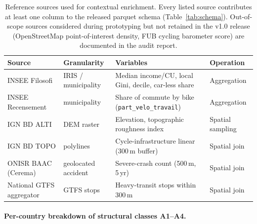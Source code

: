 \documentclass[11pt,a4paper]{article}
\begin{document}
\begin{table}[!htbp]
\centering
\caption{Reference sources used for contextual enrichment. Every
listed source contributes at least one column to the released
parquet schema (Table~\ref{tab:schema}). Out-of-scope sources
considered during prototyping but not retained in the v1.0
release (OpenStreetMap point-of-interest density, FUB cycling
barometer score) are documented in the audit report.}
\label{tab:sources}
\small
\begin{tabular}{@{}llll@{}}
\toprule
\textbf{Source} & \textbf{Granularity} & \textbf{Variables} &
\textbf{Operation}\\
\midrule
INSEE Filosofi      & IRIS / municipality &
   Median income/CU, local Gini, decile, car-less share & Aggregation \\
INSEE Recensement   & municipality &
   Share of commute by bike (\texttt{part\_velo\_travail})  & Aggregation \\
IGN BD ALTI         & DEM raster &
   Elevation, topographic roughness index & Spatial sampling \\
IGN BD TOPO         & polylines &
   Cycle-infrastructure linear (300\,m buffer) & Spatial join \\
ONISR BAAC (Cerema) & geolocated accident &
   Severe-crash count (500\,m, 5\,yr) & Spatial join \\
National GTFS aggregator & GTFS stops &
   Heavy-transit stops within 300\,m & Spatial join \\
\bottomrule
\end{tabular}
\end{table}

\paragraph{Per-country breakdown of structural classes A1--A4.}
\end{document}
